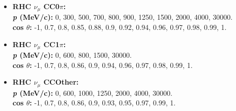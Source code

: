 \begin{itemize}
\item \textbf{RHC $\nu_{\mu}$ CC0$\pi$:}\\
\textbf{\textit{p} (MeV/c):} 0, 300, 500, 700, 800, 900, 1250, 1500, 2000, 4000, 30000.\\
\textbf{cos $\theta$:} -1, 0.7, 0.8, 0.85, 0.88, 0.9, 0.92, 0.94, 0.96, 0.97, 0.98, 0.99, 1.

\item \textbf{RHC $\nu_{\mu}$ CC1$\pi$:}\\
\textbf{\textit{p} (MeV/c):} 0, 600, 800, 1500, 30000.\\
\textbf{cos $\theta$:} -1, 0.7, 0.8, 0.86, 0.9, 0.94, 0.96, 0.97, 0.98, 0.99, 1.

\item \textbf{RHC $\nu_{\mu}$ CCOther:}\\
\textbf{\textit{p} (MeV/c):} 0, 600, 1000, 1250, 2000, 4000, 30000.\\
\textbf{cos $\theta$:} -1, 0.7, 0.8, 0.86, 0.9, 0.93, 0.95, 0.97, 0.99, 1.

\end{itemize}

